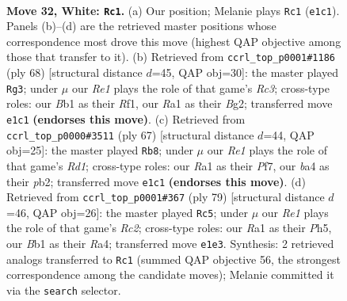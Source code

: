 \documentclass[11pt]{article}
\begin{document}
\clearpage

\begin{figure}[p]\centering
\begin{subfigure}{0.46\textwidth}\centering
\resizebox{\linewidth}{!}{%
\newchessgame
\chessboard[
  setfen={r7/pp3pk1/8/7p/bP1rP3/P5Pp/5P2/RB2R1K1 w - - 0 32},
  showmover=false,
  pgfstyle=straightmove, color=movearrow, markmove={e1-c1}
]}
\caption{}
\end{subfigure}\hfill
\begin{subfigure}{0.46\textwidth}\centering
\resizebox{\linewidth}{!}{%
\newchessgame
\chessboard[
  setfen={4r3/p5k1/4ppp1/2P5/1r3Pb1/1PR5/P5B1/2K2R2 w - - 5 35},
  showmover=false,
  pgfstyle=straightmove, color=movearrow, markmove={c3-g3}
]}
\caption{}
\end{subfigure}
\\[4pt]
\begin{subfigure}{0.46\textwidth}\centering
\resizebox{\linewidth}{!}{%
\newchessgame
\chessboard[
  setfen={b2r1k2/p4p2/6p1/P2pR3/2p2P2/6P1/1PP5/2K2B2 b - - 1 34},
  showmover=false,
  pgfstyle=straightmove, color=movearrow, markmove={d8-b8}
]}
\caption{}
\end{subfigure}\hfill
\begin{subfigure}{0.46\textwidth}\centering
\resizebox{\linewidth}{!}{%
\newchessgame
\chessboard[
  setfen={8/2r1k3/pR3p2/7p/r1p1P1bP/4R3/6P1/4B1K1 b - - 1 40},
  showmover=false,
  pgfstyle=straightmove, color=movearrow, markmove={c7-c5}
]}
\caption{}
\end{subfigure}
\caption{\textbf{Move 32, White: \texttt{Rc1}.} (a) Our position; Melanie plays \texttt{Rc1} (\texttt{e1c1}). Panels (b)--(d) are the retrieved master positions whose correspondence most drove this move (highest QAP objective among those that transfer to it). (b) Retrieved from \texttt{ccrl\_top\_p0001\#1186} (ply 68) [structural distance $d$=45, QAP obj=30]: the master played \texttt{Rg3}; under $\mu$ our \emph{Re1} plays the role of that game's \emph{Rc3}; cross-type roles: our \emph{B}b1 as their \emph{R}f1, our \emph{R}a1 as their \emph{B}g2; transferred move \texttt{e1c1} \textbf{(endorses this move)}. (c) Retrieved from \texttt{ccrl\_top\_p0000\#3511} (ply 67) [structural distance $d$=44, QAP obj=25]: the master played \texttt{Rb8}; under $\mu$ our \emph{Re1} plays the role of that game's \emph{Rd1}; cross-type roles: our \emph{R}a1 as their \emph{P}f7, our \emph{b}a4 as their \emph{p}b2; transferred move \texttt{e1c1} \textbf{(endorses this move)}. (d) Retrieved from \texttt{ccrl\_top\_p0001\#367} (ply 79) [structural distance $d$=46, QAP obj=26]: the master played \texttt{Rc5}; under $\mu$ our \emph{Re1} plays the role of that game's \emph{Rc2}; cross-type roles: our \emph{R}a1 as their \emph{P}h5, our \emph{B}b1 as their \emph{R}a4; transferred move \texttt{e1e3}. Synthesis: 2 retrieved analogs transferred to \texttt{Rc1} (summed QAP objective 56, the strongest correspondence among the candidate moves); Melanie committed it via the \texttt{search} selector.}
\label{fig:thought-m62}
\end{figure}
\end{document}
